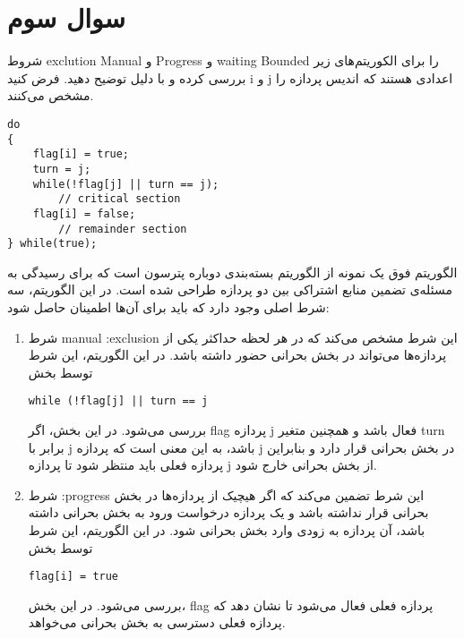 \section{سوال سوم}

شروط exclution Manual و Progress و  waiting Bounded را برای الکوریتم‌های زیر بررسی کرده و با دلیل توضیح دهید. فرض کنید i و j اعدادی هستند که اندیس پردازه را مشخص می‌کنند.

\begin{latin}
\begin{lstlisting}[caption=Code I]
do
{
	flag[i] = true;
	turn = j;
	while(!flag[j] || turn == j);
		// critical section
	flag[i] = false;
		// remainder section
} while(true);
\end{lstlisting}
\end{latin}


\begin{qsolve}
	الگوریتم فوق یک نمونه از الگوریتم بسته‌بندی دوباره پترسون است که برای رسیدگی به مسئله‌ی تضمین منابع اشتراکی بین دو پردازه طراحی شده است. در این الگوریتم، سه شرط اصلی وجود دارد که باید برای آن‌ها اطمینان حاصل شود:
	
	\begin{enumerate}
		\item شرط manual :exclusion
		 این شرط مشخص می‌کند که در هر لحظه حداکثر یکی از پردازه‌ها می‌تواند در بخش بحرانی حضور داشته باشد. در این الگوریتم، این شرط توسط بخش
		 \begin{latin}
		 	\texttt{while (!flag[j] || turn == j} 
		 \end{latin}
بررسی می‌شود. در این بخش، اگر flag پردازه j فعال باشد و همچنین متغیر turn برابر با j باشد، به این معنی است که پردازه j در بخش بحرانی قرار دارد و بنابراین پردازه فعلی باید منتظر شود تا پردازه j از بخش بحرانی خارج شود.
		
		
		
		\item شرط :progress
		 این شرط تضمین می‌کند که اگر هیچیک از پردازه‌ها در بخش بحرانی قرار نداشته باشد و یک پردازه درخواست ورود به بخش بحرانی داشته باشد، آن پردازه به زودی وارد بخش بحرانی شود. در این الگوریتم، این شرط توسط بخش
		 \begin{latin}
		 	\texttt{flag[i] = true} 
		 \end{latin}
بررسی می‌شود. در این بخش، flag پردازه فعلی فعال می‌شود تا نشان دهد که پردازه فعلی دسترسی به بخش بحرانی می‌خواهد.
		
		
		

\end{enumerate}
\end{qsolve}
